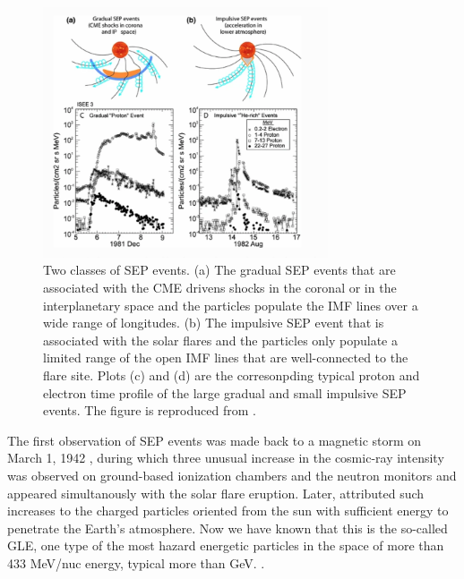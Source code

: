 \begin{figure}[!htb]
	\centering
	\includegraphics[width = 0.75\textwidth]{images/SEP_two_type.png}
	\caption[Two types of Solar energetic particle (SEP) event]{Two classes of \ac{SEP} events. (a) The gradual \ac{SEP} events that are associated with the CME drivens shocks in the coronal or in the interplanetary space and the particles populate the \ac{IMF} lines over a wide range of longitudes. (b) The impulsive SEP event that is associated with the solar flares and the particles only populate a limited range of the open \ac{IMF} lines that are well-connected to the flare site. Plots (c) and (d) are the corresonpding typical proton and electron time profile of the large gradual and small impulsive SEP events. The figure is reproduced from \citet{Desai_Diacalone2016LRSP}.}
	\label{Fig:two_type_SEP}
\end{figure}
The first observation of \ac{SEP} events was made back to a magnetic storm on March 1, 1942 \citep{lange1942note,forbush1942further}, during which three unusual increase in the cosmic-ray intensity was observed on ground-based ionization chambers and the neutron monitors and appeared simultanously with the solar flare eruption. Later, \citet{Forbush1946} attributed such increases to the charged particles oriented from the sun with sufficient energy to penetrate the Earth's atmosphere. Now we have known that this is the so-called \ac{GLE}, one type of the most hazard energetic particles in the space of more than 433 MeV/nuc energy, typical more than GeV. \citep{meyer1956solar,Shea2012SSRv,gopalswamy2013first,thakur2014ground, Reames2013, Mironshnichenko2013Ge}.

